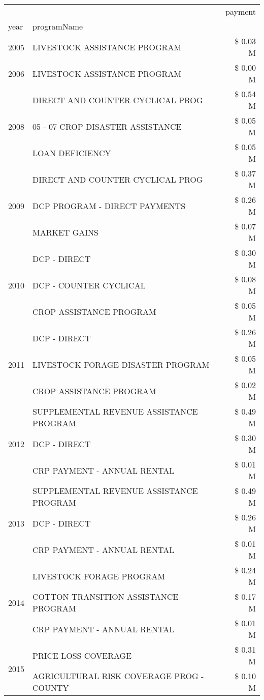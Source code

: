\begin{tabular}{llr}
\toprule
 &  & payment \\
year & programName &  \\
\midrule
2005 & LIVESTOCK ASSISTANCE PROGRAM & \$ 0.03 M \\
\cline{1-3}
2006 & LIVESTOCK ASSISTANCE PROGRAM & \$ 0.00 M \\
\cline{1-3}
\multirow[t]{3}{*}{2008} & DIRECT AND COUNTER CYCLICAL PROG & \$ 0.54 M \\
 & 05 - 07 CROP DISASTER ASSISTANCE & \$ 0.05 M \\
 & LOAN DEFICIENCY & \$ 0.05 M \\
\cline{1-3}
\multirow[t]{3}{*}{2009} & DIRECT AND COUNTER CYCLICAL PROG & \$ 0.37 M \\
 & DCP PROGRAM - DIRECT PAYMENTS & \$ 0.26 M \\
 & MARKET GAINS & \$ 0.07 M \\
\cline{1-3}
\multirow[t]{3}{*}{2010} & DCP - DIRECT & \$ 0.30 M \\
 & DCP - COUNTER CYCLICAL & \$ 0.08 M \\
 & CROP ASSISTANCE PROGRAM & \$ 0.05 M \\
\cline{1-3}
\multirow[t]{3}{*}{2011} & DCP - DIRECT & \$ 0.26 M \\
 & LIVESTOCK FORAGE DISASTER PROGRAM & \$ 0.05 M \\
 & CROP ASSISTANCE PROGRAM & \$ 0.02 M \\
\cline{1-3}
\multirow[t]{3}{*}{2012} & SUPPLEMENTAL REVENUE ASSISTANCE PROGRAM & \$ 0.49 M \\
 & DCP - DIRECT & \$ 0.30 M \\
 & CRP PAYMENT - ANNUAL RENTAL & \$ 0.01 M \\
\cline{1-3}
\multirow[t]{3}{*}{2013} & SUPPLEMENTAL REVENUE ASSISTANCE PROGRAM & \$ 0.49 M \\
 & DCP - DIRECT & \$ 0.26 M \\
 & CRP PAYMENT - ANNUAL RENTAL & \$ 0.01 M \\
\cline{1-3}
\multirow[t]{3}{*}{2014} & LIVESTOCK FORAGE PROGRAM & \$ 0.24 M \\
 & COTTON TRANSITION ASSISTANCE PROGRAM & \$ 0.17 M \\
 & CRP PAYMENT - ANNUAL RENTAL & \$ 0.01 M \\
\cline{1-3}
\multirow[t]{3}{*}{2015} & PRICE LOSS COVERAGE & \$ 0.31 M \\
 & AGRICULTURAL RISK COVERAGE PROG - COUNTY & \$ 0.10 M \\

\end{tabular}
